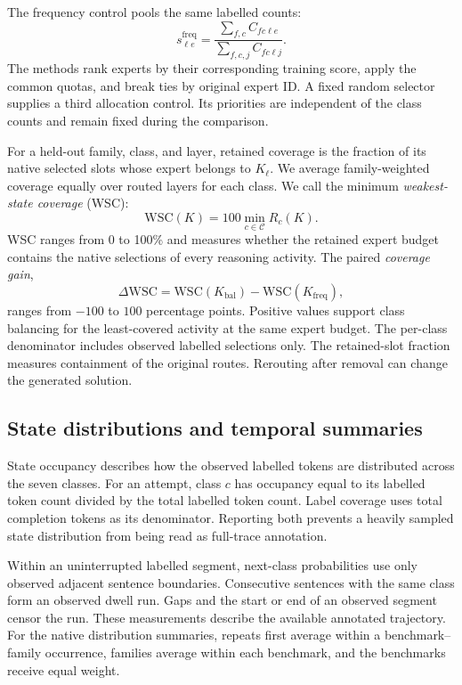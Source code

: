 The frequency control pools the same labelled counts:
\begin{equation}
 s^{\mathrm{freq}}_{\ell e}
 =\frac{\sum_{f,c}C_{fc\ell e}}{\sum_{f,c,j}C_{fc\ell j}}.
 \label{eq:frequency-selection}
\end{equation}
The methods rank experts by their corresponding training score, apply the common quotas, and break ties by original expert ID.
%
A fixed random selector supplies a third allocation control.
%
Its priorities are independent of the class counts and remain fixed during the comparison.
%

For a held-out family, class, and layer, retained coverage is the fraction of its native selected slots whose expert belongs to $K_\ell$.
%
We average family-weighted coverage equally over routed layers for each class.
%
We call the minimum \emph{weakest-state coverage} (WSC):
\begin{equation}
 \mathrm{WSC}(K)=100\min_{c\in\mathcal C}R_c(K).
 \label{eq:min-coverage}
\end{equation}
WSC ranges from 0 to 100\% and measures whether the retained expert budget contains the native selections of every reasoning activity.
%
The paired \emph{coverage gain},
\begin{equation}
 \Delta\mathrm{WSC}=\mathrm{WSC}(K_{\mathrm{bal}})
 -\mathrm{WSC}(K_{\mathrm{freq}}),
 \label{eq:coverage-gain}
\end{equation}
ranges from $-100$ to $100$ percentage points.
%
Positive values support class balancing for the least-covered activity at the same expert budget.
%
The per-class denominator includes observed labelled selections only.
%
The retained-slot fraction measures containment of the original routes.
%
Rerouting after removal can change the generated solution.
%

\subsection{State distributions and temporal summaries}
\label{sec:dynamics-method}

State occupancy describes how the observed labelled tokens are distributed across the seven classes.
%
For an attempt, class $c$ has occupancy equal to its labelled token count divided by the total labelled token count.
%
Label coverage uses total completion tokens as its denominator.
%
Reporting both prevents a heavily sampled state distribution from being read as full-trace annotation.
%

Within an uninterrupted labelled segment, next-class probabilities use only observed adjacent sentence boundaries.
%
Consecutive sentences with the same class form an observed dwell run.
%
Gaps and the start or end of an observed segment censor the run.
%
These measurements describe the available annotated trajectory.
%
For the native distribution summaries, repeats first average within a benchmark--family occurrence, families average within each benchmark, and the benchmarks receive equal weight.
%

